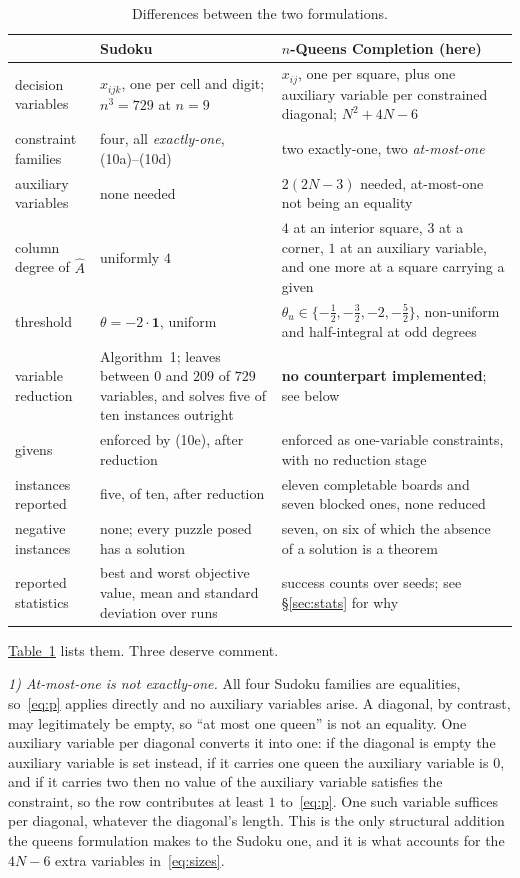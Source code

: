 \documentclass{easychair}
\newcommand{\secref}[1]{\hyperref[#1]{\textcolor{academicpurple}{\S\ref*{#1}}}}
\newcommand{\citeref}[1]{\textcolor{academicpurple}{\cite{#1}}}
\newcommand{\tabref}[1]{\textcolor{academicpurple}{\hyperref[#1]{Table~\ref*{#1}}}}
\begin{document}
\begin{table}[t]
\centering\small
\setlength{\tabcolsep}{4pt}
\begin{tabular}{@{}p{}p{}p{}@{}}
\toprule
& Sudoku~\citeref{liwang2022} & $n$-Queens Completion (here)\\
\midrule
decision variables & $x_{ijk}$, one per cell and digit; $n^3 = 729$ at $n = 9$ &
  $x_{ij}$, one per square, plus one auxiliary variable per constrained diagonal; $N^2+4N-6$\\
constraint families & four, all \emph{exactly-one}, (10a)--(10d) &
  two exactly-one, two \emph{at-most-one}\\
auxiliary variables & none needed &
  $2(2N-3)$ needed, at-most-one not being an equality\\
column degree of $\hat A$ & uniformly $4$ &
  $4$ at an interior square, $3$ at a corner, $1$ at an auxiliary variable, and one more at a square
  carrying a given\\
threshold & $\theta = -2\cdot\mathbf{1}$, uniform &
  $\theta_u \in \{-\tfrac12, -\tfrac32, -2, -\tfrac52\}$, non-uniform and half-integral at odd
  degrees\\
variable reduction & Algorithm~1; leaves between $0$ and $209$ of $729$ variables, and solves five
  of ten instances outright & \textbf{no counterpart implemented}; see below\\
givens & enforced by (10e), after reduction &
  enforced as one-variable constraints, with no reduction stage\\
instances reported & five, of ten, after reduction &
  eleven completable boards and seven blocked ones, none reduced\\
negative instances & none; every puzzle posed has a solution &
  seven, on six of which the absence of a solution is a theorem\\
reported statistics & best and worst objective value, mean and standard deviation over runs &
  success counts over seeds; see \secref{sec:stats} for why\\
\bottomrule
\end{tabular}
\caption{Differences between the two formulations.}\label{tab:diff}
\end{table}

\tabref{tab:diff} lists them. Three deserve comment.

\emph{1) At-most-one is not exactly-one.} All four Sudoku families are equalities, so~\eqref{eq:p}
applies directly and no auxiliary variables arise. A diagonal, by contrast, may legitimately be
empty, so \enquote{at most one queen} is not an equality. One auxiliary variable per diagonal
converts it into one: if the diagonal is empty the auxiliary variable is set instead, if it carries
one queen the auxiliary variable is $0$, and if it carries two then no value of the auxiliary
variable satisfies the constraint, so the row contributes at least $1$ to~\eqref{eq:p}. One such
variable suffices per diagonal, whatever the diagonal's length. This is the only structural addition
the queens formulation makes to the Sudoku one, and it is what accounts for the $4N-6$ extra
variables in~\eqref{eq:sizes}.
\end{document}

